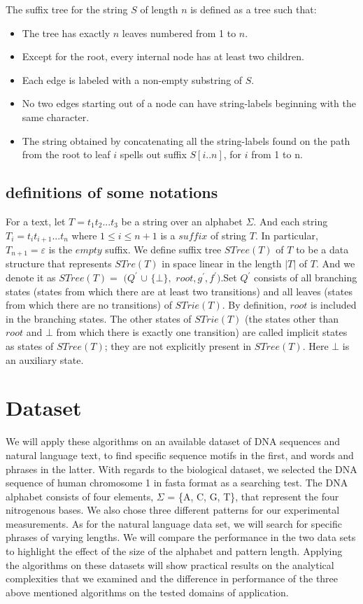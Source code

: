 \documentclass[paper=a4, fontsize=11pt]{scrartcl} %
\numberwithin{equation}{section} %
\numberwithin{figure}{section} %
\numberwithin{table}{section} %
\begin{document}
The suffix tree for the string $S$ of length $n$ is defined as a tree such that:
\begin{itemize}
  \item The tree has exactly $n$ leaves numbered from 1 to $n$.
  \item Except for the root, every internal node has at least two children.
  \item Each edge is labeled with a non-empty substring of $S$.
  \item No two edges starting out of a node can have string-labels beginning with the same character.
  \item  The string obtained by concatenating all the string-labels found on the path from the root to leaf $i$ spells out suffix $S[i..n]$, for $i$ from 1 to n.
\end{itemize}

\subsection{definitions of some notations}
For a text, let $T = t_1t_2...t_3$ be a string over an alphabet $\Sigma$. And each string $T_i = t_it_{i+1}...t_n$ where $1 \leq i \leq n+1$ is a $suffix$ of string $T$. In particular, $T_{n+1} = \varepsilon$ is the $empty$ suffix. We define suffix tree $STree(T)$ of $T$ to be a data structure that represents $STre(T)$ in space linear in the length $|T|$ of $T$. And we denote it as $STree(T) =$
$(Q^{'}$
$\cup$
$\{\bot\},$
$root, g^{'}, f^{'})$.Set $Q^{'}$ consists of all branching states (states from which there
are at least two transitions) and all leaves (states from which there are no transitions) of $STrie(T)$. By definition, $root$ is included in the branching states.
The other states of $STrie(T)$ (the states other than $root$ and $\bot$ from which
there is exactly one transition) are called implicit states as states of $STree(T)$; they
are not explicitly present in $STree(T)$. Here $\bot$ is an auxiliary state.

\newpage

\section{Dataset}
We will apply these algorithms on an available dataset of DNA sequences and natural language text, to find specific sequence motifs in the first, and words and phrases in the latter. With regards to the biological dataset, we selected  the DNA sequence of  human chromosome 1 in fasta format as a searching test. The DNA alphabet consists of four elements, $\Sigma$ = \{A, C, G, T\}, that represent  the four nitrogenous bases. We also chose three different patterns for our experimental measurements. As for the natural language data set, we will search for specific phrases of varying lengths. We will compare the performance in the two data sets to highlight the effect of the size of the alphabet and pattern length.
Applying the algorithms on these datasets will show practical results on the analytical complexities that we examined and the difference in performance of the three above mentioned algorithms on the tested domains of application.
\end{document}
